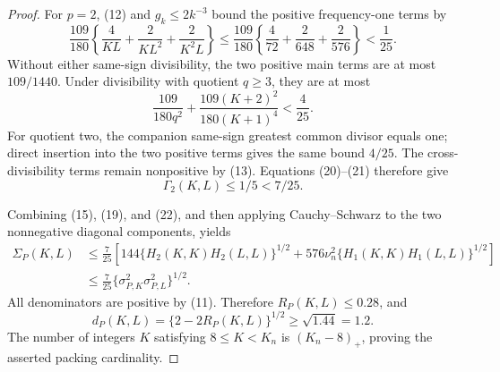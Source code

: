 \documentclass{article}
\begin{document}
\begin{proof}
For \(p=2\), (12) and \(g_k\leq2k^{-3}\) bound the positive frequency-one terms by
\[
 \frac{109}{180}\left\{\frac4{KL}+\frac2{KL^2}+\frac2{K^2L}\right\}
 \leq\frac{109}{180}\left\{\frac4{72}+\frac2{648}+\frac2{576}\right\}<\frac1{25}. \tag{20}
\]
Without either same-sign divisibility, the two positive main terms are at most \(109/1440\).  Under divisibility with quotient \(q\geq3\), they are at most
\[
 \frac{109}{180q^2}+\frac{109(K+2)^2}{180(K+1)^4}<\frac4{25}.                   \tag{21}
\]
For quotient two, the companion same-sign greatest common divisor equals one; direct insertion into the two positive terms gives the same bound \(4/25\).  The cross-divisibility terms remain nonpositive by (13).  Equations (20)--(21) therefore give
\[
 \Gamma_2(K,L)\leq1/5<7/25.                                                     \tag{22}
\]

Combining (15), (19), and (22), and then applying Cauchy--Schwarz to the two nonnegative diagonal components, yields
\[
 \begin{aligned}
 \Sigma_P(K,L)
 &\leq\frac7{25}\left[144\{H_2(K,K)H_2(L,L)\}^{1/2}
 +576\nu_n^2\{H_1(K,K)H_1(L,L)\}^{1/2}\right]\\
 &\leq\frac7{25}\{\sigma_{P,K}^2\sigma_{P,L}^2\}^{1/2}.
 \end{aligned}                                                                    \tag{23}
\]
All denominators are positive by (11).  Therefore \(R_P(K,L)\leq0.28\), and
\[
 d_P(K,L)=\{2-2R_P(K,L)\}^{1/2}\geq\sqrt{1.44}=1.2.                            \tag{24}
\]
The number of integers \(K\) satisfying \(8\leq K<K_n\) is \((K_n-8)_+\), proving the asserted packing cardinality.


\end{proof}
\end{document}
